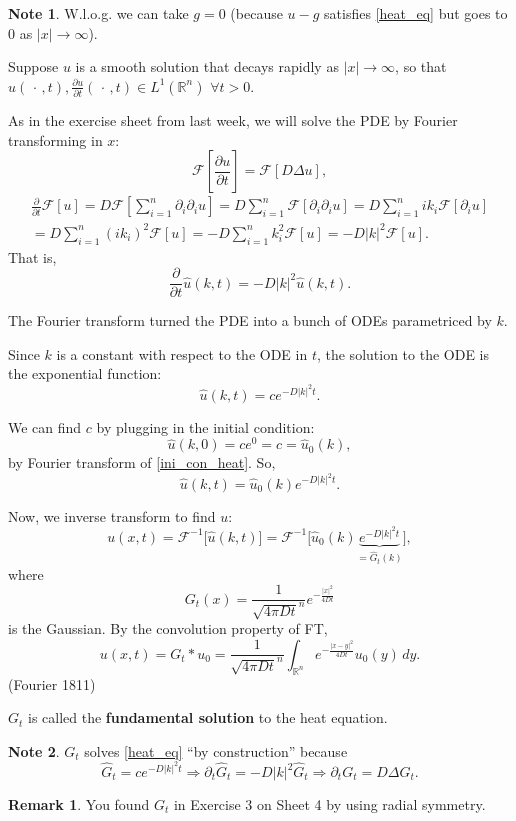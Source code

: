 \documentclass[12pt]{article}
\theoremstyle{definition}
\newtheorem*{remark}{Remark}
\newtheorem*{note}{Note}
\begin{document}
\begin{note}
W.l.o.g. we can take $g=0$ (because $u-g$ satisfies \eqref{heat_eq} but goes to $0$ as $|x|\to\infty$).
\end{note}

Suppose $u$ is a smooth solution that decays rapidly as $|x|\to\infty$, so that $u(\,\cdot\,,t),\frac{\partial u}{\partial t}(\,\cdot\,,t)\in L^1(\mathbb R^n)$ $\forall t>0$.

As in the exercise sheet from last week, we will solve the PDE by Fourier transforming in $x$:
\[\mathcal F\left[\frac{\partial u}{\partial t}\right]=\mathcal F[D\Delta u],\]
\begin{multline*}
\frac\partial{\partial t}\mathcal F[u]=D\mathcal F\left[\sum_{i=1}^n\partial_i\partial_iu\right]=D\sum_{i=1}^n\mathcal F[\partial_i\partial_iu]=D\sum_{i=1}^nik_i\mathcal F[\partial_iu]\\
=D\sum_{i=1}^n(ik_i)^2\mathcal F[u]=-D\sum_{i=1}^nk_i^2\mathcal F[u]=-D|k|^2\mathcal F[u].
\end{multline*}
That is,
\[\frac\partial{\partial t}\hat u(k,t)=-D|k|^2\hat u(k,t).\]

The Fourier transform turned the PDE into a bunch of ODEs parametriced by $k$.

Since $k$ is a constant with respect to the ODE in $t$, the solution to the ODE is the exponential function:
\[\hat u(k,t)=ce^{-D|k|^2t}.\]

We can find $c$ by plugging in the initial condition:
\[\hat u(k,0)=ce^0=c=\hat u_0(k),\]
by Fourier transform of \eqref{ini_con_heat}. So,
\[\hat u(k,t)=\hat u_0(k)e^{-D|k|^2t}.\]

Now, we inverse transform to find $u$:
\[u(x,t)=\mathcal F^{-1}\big[\hat u(k,t)\big]=\mathcal F^{-1}\big[\hat u_0(k)\underbrace{e^{-D|k|^2t}}_{=\widehat G_t(k)}\big],\]
where
\[G_t(x)=\frac1{\sqrt{4\pi Dt}^n}e^{-\frac{|x|^2}{4Dt}}\]
is the Gaussian. By the convolution property of FT,
\[u(x,t)=G_t*u_0=\frac1{\sqrt{4\pi Dt}^n}\int_{\mathbb R^n}e^{-\frac{|x-y|^2}{4Dt}}u_0(y)\,dy.\]
(Fourier 1811)

$G_t$ is called the \textbf{fundamental solution} to the heat equation.

\begin{note}
$G_t$ solves \eqref{heat_eq} ``by construction'' because
\[\widehat G_t=ce^{-D|k|^2t}\Longrightarrow\partial_t\widehat G_t=-D|k|^2\widehat G_t\Longrightarrow\partial_tG_t=D\Delta G_t.\]
\end{note}

\begin{remark}
You found $G_t$ in Exercise 3 on Sheet 4 by using radial symmetry.
\end{remark}
\end{document}
